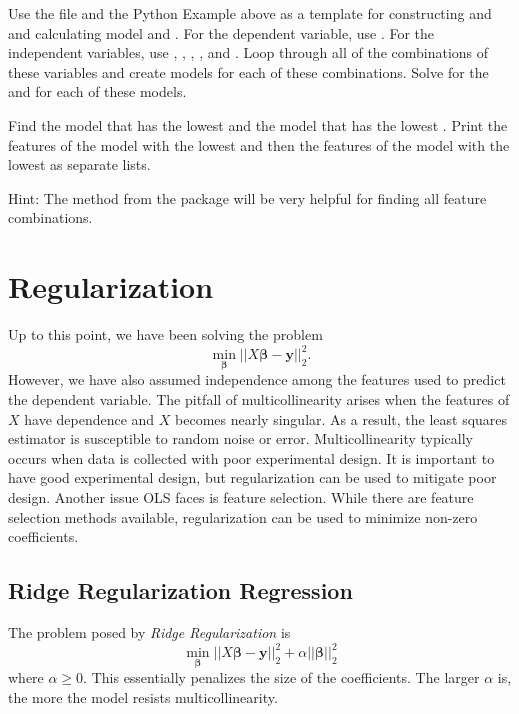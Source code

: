 \begin{problem}
Use the file  and the Python Example above as a template for constructing  and  and calculating model  and . 
For the dependent variable, use . 
For the independent variables, use , , , , and .
Loop through all of the combinations of these variables and create  models for each of these combinations.
Solve for the  and  for each of these models.

Find the model that has the lowest  and the model that has the lowest . 
Print the features of the model with the lowest  and then the features of the model with the lowest  as separate lists.

Hint: The  method from the  package will be very helpful for finding all feature combinations. 
\label{prob:feature-selection}
\end{problem}

\section*{Regularization}
Up to this point, we have been solving the problem \[ \min_{\boldsymbol\beta} \vert\vert X\boldsymbol\beta - \boldsymbol y \vert\vert_2^2. \]
However, we have also assumed independence among the features used to predict the dependent variable. 
The pitfall of multicollinearity arises when the features of $X$ have dependence and $X$ becomes nearly singular.
As a result, the least squares estimator is susceptible to random noise or error. 
Multicollinearity typically occurs when data is collected with poor experimental design. 
It is important to have good experimental design, but regularization can be used to mitigate poor design. 
Another issue OLS faces is feature selection. 
While there are feature selection methods available, regularization can be used to minimize non-zero coefficients. 

\subsection*{Ridge Regularization Regression}
The problem posed by \textit{Ridge Regularization} is \[ \min_{\boldsymbol\beta} \vert\vert X\boldsymbol\beta - \boldsymbol y \vert\vert_2^2 + \alpha \vert\vert \boldsymbol\beta \vert\vert_2^2 \]
where $\alpha \geq 0$. This essentially penalizes the size of the coefficients.
The larger $\alpha$ is, the more the model resists multicollinearity. 

